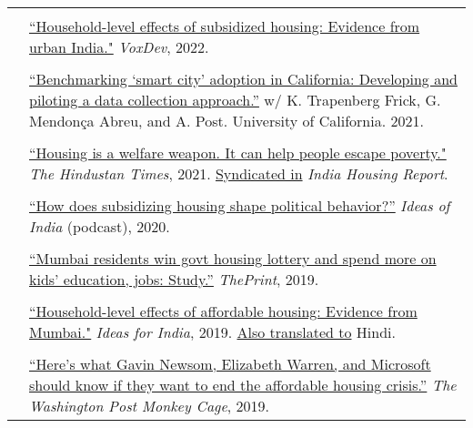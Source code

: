 \documentclass[letterpaper, 10.5pt]{article}
\begin{document}
\begin{longtable}{p{1.5in}p{5in}}
& \\
& \href{https://voxdev.org/topic/infrastructure-urbanisation/household-level-effects-subsidised-housing-evidence-urban-india?utm_source=dlvr.it&utm_medium=twitter}{``Household-level effects of subsidized housing: Evidence from urban India."} \textit{VoxDev}, 2022.\\
& \\

& \href{https://escholarship.org/uc/item/3797p0ws}{``Benchmarking `smart city' adoption in California: Developing and piloting a data collection approach.''} w/ K. Trapenberg Frick, G. Mendon\c{c}a Abreu, and A. Post. University of California. 2021. \\
& \\

& \href{https://www.hindustantimes.com/opinion/housing-is-a-welfare-weapon-it-can-help-people-escape-poverty-101629993983576.html}{``Housing is a welfare weapon. It can help people escape poverty."} \textit{The Hindustan Times}, 2021. \href{https://indiahousingreport.in/outputs/opinion/housing-is-a-welfare-weapon-it-can-help-people-escape-poverty/}{Syndicated in} \textit{India Housing Report}. \\ 
& \\
&   \href{https://www.discoursemagazine.com/politics/2020/12/24/ideas-of-india-how-does-subsidizing-housing-prices-shape-political-behavior}{``How does subsidizing housing shape political behavior?''} \textit{Ideas of India} (podcast), 2020.\\

& \\
& \href{https://theprint.in/opinion/mumbai-residents-win-govt-housing-lottery-and-spend-more-on-kids-education-jobs-study/290485/}{``Mumbai residents win govt housing lottery and spend more on kids' education, jobs: Study.''} \textit{ThePrint}, 2019. \\
& \\
&\href{https://www.ideasforindia.in/topics/poverty-inequality/household-level-effects-of-affordable-housing-evidence-from-mumbai.html}{``Household-level effects of affordable housing: Evidence from Mumbai."} \textit{Ideas for India}, 2019.  \href{https://www.ideasforindia.in/topics/poverty-inequality/household-level-effects-of-affordable-housing-evidence-from-mumbai-hindi.html}{Also translated to} Hindi.\\

& \\

& \href{https://www.washingtonpost.com/news/monkey-cage/wp/2019/01/31/heres-what-gavin-newsom-elizabeth-warren-and-microsoft-should-know-if-want-to-end-the-affordable-housing-crisis/?tid=sm_tw_cage}{``Here's what Gavin Newsom, Elizabeth Warren, and Microsoft should know if they want to end the affordable housing crisis.''} \textit{The Washington Post Monkey Cage}, 2019.\\




\end{longtable}
\end{document}
